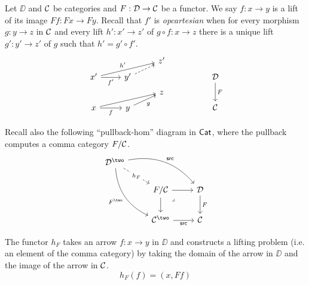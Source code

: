 Let $\DD$ and $\mathcal{C}$ be categories and
$F : \mathcal{D} \to \mathcal{C}$ be a functor.
We say $f : x \to y$ is a lift of its image $F f : F x \to F y$.
Recall that $f'$ is \emph{opcartesian}
when for every morphism $g : y \to z$ in $\mathcal{C}$
and every lift $h' : x' \to z'$ of $g \circ f : x \to z$
there is a unique lift $g' : y' \to z'$ of $g$ such that
$h' = g' \circ f'$.
\[ \begin{tikzcd}[row sep = tiny]
  && {z'} \\
  {x'} & {y'} &&& \DD \\
  && z \\
  x & y &&& \CC
  \arrow["{h'}", from=2-1, to=1-3]
  \arrow["{f'}"', from=2-1, to=2-2]
  \arrow[dashed, from=2-2, to=1-3]
  \arrow["F", from=2-5, to=4-5]
  \arrow[from=4-1, to=3-3]
  \arrow["f"', from=4-1, to=4-2]
  \arrow["g"', from=4-2, to=3-3]
\end{tikzcd}\]

Recall also the following ``pullback-hom'' diagram in $\mathsf{Cat}$,
where the pullback computes a comma category $F / \mathcal{C}$.
\begin{equation}\label{eq:pullback-hom}
\begin{tikzcd}
  {\DD^{\two}} \\
  & {F / \CC} & \DD \\
  & {\CC^{\two}} & \CC
  \arrow["{h_F}"{description}, dashed, from=1-1, to=2-2]
  \arrow["\src", bend left, from=1-1, to=2-3]
  \arrow["{F^{\two}}"', bend right, from=1-1, to=3-2]
  \arrow[from=2-2, to=2-3]
  \arrow[from=2-2, to=3-2]
  \arrow["\lrcorner"{anchor=center, pos=0.125}, draw=none, from=2-2, to=3-3]
  \arrow["F", from=2-3, to=3-3]
  \arrow["\src"', from=3-2, to=3-3]
\end{tikzcd}
\end{equation}

The functor $h_F$ takes an arrow $f : x \to y$ in $\DD$
and constructs a lifting problem (i.e. an element of the comma category)
by taking the domain of the arrow in $\DD$ and the image of the arrow in $\mathcal{C}$.
\[ h_F (f) = (x,F f)\]

